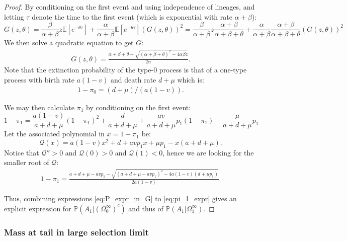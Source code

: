 \documentclass{article}
\numberwithin{equation}{section}
\begin{document}
\begin{proof}
  By conditioning on the first event and using independence of lineages, and letting $\tau$ denote the time to the first event (which is exponential with rate $\alpha+\beta$):
  \[G(z,\theta)=\frac{\beta}{\alpha+\beta}z\mathbb{E}[e^{-\theta\tau}]+\frac{\alpha}{\alpha+\beta}\mathbb{E}[e^{-\theta\tau}]\left(G(z,\theta)\right)^2=\frac{\beta}{\alpha+\beta}z\frac{\alpha+\beta}{\alpha+\beta+\theta}+\frac{\alpha}{\alpha+\beta}\frac{\alpha+\beta}{\alpha+\beta+\theta}\left(G(z,\theta)\right)^2\]
  We then solve a quadratic equation to get $G$:
  \begin{align}
      G(z,\theta)=\frac{\alpha+\beta+\theta-\sqrt{(\alpha+\beta+\theta)^2-4\alpha\beta z}}{2\alpha}.\label{eq:G_expr}
  \end{align}
Note that the extinction probability of the type-0 process is that of a one-type process with birth rate $a(1-v)$ and death rate $d+\mu$ which is:
\begin{align}
    1-\pi_0=(d+\mu)/(a(1-v)).\label{eq:pi_0_expr}
\end{align}

We may then calculate $\pi_1$ by conditioning on the first event:
\[1-\pi_1=\frac{a(1-v)}{a+d+\mu}(1-\pi_1)^2+\frac{d}{a+d+\mu}+\frac{av}{a+d+\mu}p_1(1-\pi_1)+\frac{\mu}{a+d+\mu}p_1\]
Let the associated polynomial in $x=1-\pi_1$ be:
\[\mathcal{Q}(x)=a(1-v)x^2+d+avp_1x+\mu p_1-x(a+d+\mu).\]
Notice that $\mathcal{Q}''>0$ and $\mathcal{Q}(0)>0$ and $\mathcal{Q}(1)<0$, hence we are looking for the smaller root of $\mathcal{Q}$:
\begin{align}
    1-\pi_1=\frac{a+d+\mu-av p_1-\sqrt{(a+d+\mu-avp_1)^2-4a(1-v)(d+\mu p_1)}}{2a(1-v)}.\label{eq:pi_1_expr}
\end{align}

Thus, combining expressions \ref{eq:P_expr_in_G} to \ref{eq:pi_1_expr} gives an explicit expression for $\mathbb{P}(A_1|(\Omega_0^\infty)^c)$ and thus of $\mathbb{P}(A_1|\Omega_1^\infty)$.

\end{proof}


\subsubsection{Mass at tail in large selection limit}\label{app:freeze}
\end{document}
